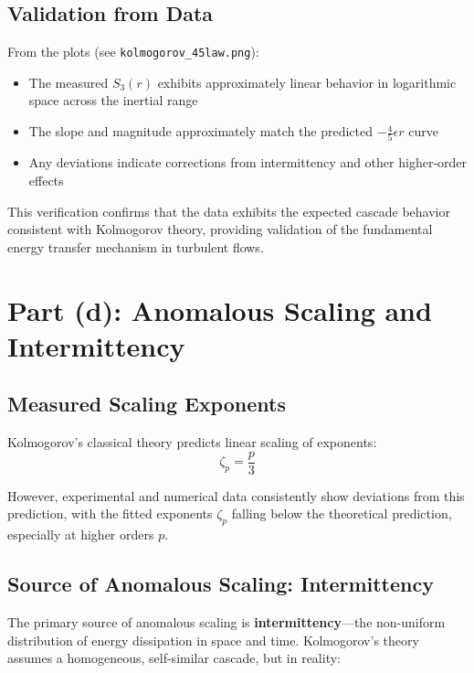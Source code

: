 \documentclass[12pt]{article}
\begin{document}
\subsection*{Validation from Data}

From the plots (see \texttt{kolmogorov\_45law.png}):
\begin{itemize}
    \item The measured $S_3(r)$ exhibits approximately linear behavior in logarithmic space across the inertial range
    \item The slope and magnitude approximately match the predicted $-\frac{4}{5}\epsilon r$ curve
    \item Any deviations indicate corrections from intermittency and other higher-order effects
\end{itemize}

This verification confirms that the data exhibits the expected cascade behavior consistent with Kolmogorov theory, providing validation of the fundamental energy transfer mechanism in turbulent flows.

\newpage

\section*{Part (d): Anomalous Scaling and Intermittency}

\subsection*{Measured Scaling Exponents}

Kolmogorov's classical theory predicts linear scaling of exponents:
\begin{equation}
\zeta_p = \frac{p}{3}
\end{equation}

However, experimental and numerical data consistently show deviations from this prediction, with the fitted exponents $\zeta_p$ falling below the theoretical prediction, especially at higher orders $p$.

\subsection*{Source of Anomalous Scaling: Intermittency}

The primary source of anomalous scaling is \textbf{intermittency}---the non-uniform distribution of energy dissipation in space and time. Kolmogorov's theory assumes a homogeneous, self-similar cascade, but in reality:
\end{document}
